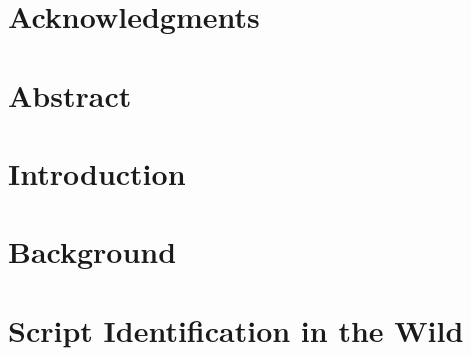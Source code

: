 \documentclass[11pt]{book}
\renewcommand{\baselinestretch}{1.2}
\begin{document}



\newpage
\thispagestyle{empty}
\renewcommand{\thesisdedication}{{\large Copyright \copyright~~Ajeet Kumar Singh, 2015\\}{\large All Rights Reserved\\}}
\thesisdedicationpage



\newpage
\thispagestyle{empty}
\renewcommand{\thesisdedication}{\large To My Parents}
\thesisdedicationpage

\mastersthesis
\renewcommand{\baselinestretch}{1.5}

\chapter*{Acknowledgments}
\label{ch:ack}


\chapter*{Abstract}
\label{ch:abstract}


\tableofcontents
\listoffigures
\listoftables

\chapter{Introduction}
\label{ch:intro}



\chapter{Background}
\label{ch:chap2}



\chapter{Script Identification in the Wild}
\label{ch:chap3}


\end{document}
